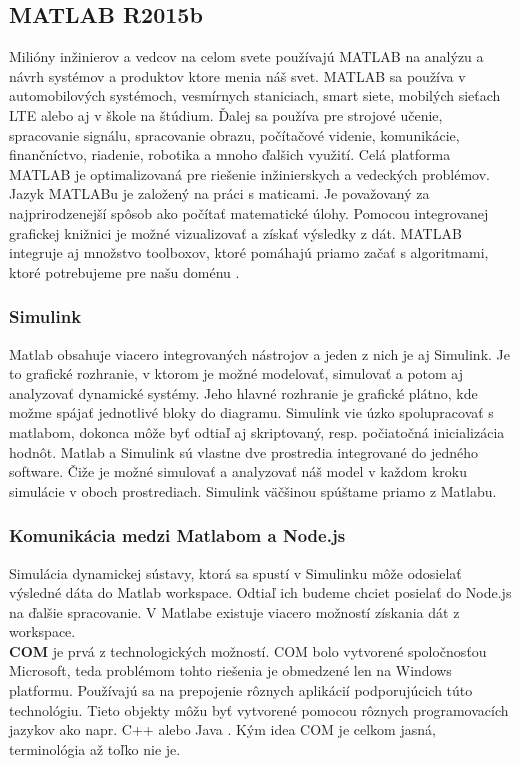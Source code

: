 \subsection{MATLAB R2015b}
Milióny inžinierov a vedcov na celom svete používajú MATLAB na analýzu a návrh systémov a produktov ktore menia náš svet. MATLAB sa používa v automobilových systémoch, vesmírnych staniciach, smart siete, mobilých sieťach LTE alebo aj v škole na štúdium. Ďalej sa používa pre strojové učenie, spracovanie signálu, spracovanie obrazu, počítačové videnie, komunikácie, finančníctvo, riadenie, robotika a mnoho ďalšich využití.
Celá platforma MATLAB je optimalizovaná pre riešenie inžinierskych a vedeckých problémov. Jazyk MATLABu je založený na práci s maticami. Je považovaný za najprirodzenejší spôsob ako počítať matematické úlohy. Pomocou integrovanej grafickej knižnici je možné vizualizovať a získať výsledky z dát. MATLAB integruje aj množstvo toolboxov, ktoré pomáhajú priamo začať s algoritmami, ktoré potrebujeme pre našu doménu \cite{matlab-mathworks}.

\subsubsection{Simulink}
Matlab obsahuje viacero integrovaných nástrojov a jeden z nich je aj Simulink. Je to grafické rozhranie, v ktorom je možné modelovať, simulovať a potom aj analyzovať dynamické systémy. Jeho hlavné rozhranie je grafické plátno, kde možme spájať jednotlivé bloky do diagramu. Simulink vie úzko spolupracovať s matlabom, dokonca môže byť odtiaľ aj skriptovaný, resp. počiatočná inicializácia hodnôt. Matlab a Simulink sú vlastne dve prostredia integrované do jedného software. Čiže je možné simulovať a analyzovať náš model v každom kroku simulácie v oboch prostrediach. Simulink väčšinou spúštame priamo z Matlabu.

\subsubsection{Komunikácia medzi Matlabom a Node.js}
Simulácia dynamickej sústavy, ktorá sa spustí v Simulinku môže odosielať výsledné dáta do Matlab workspace. Odtiaľ ich budeme chciet posielať do Node.js na ďalšie spracovanie. V Matlabe existuje viacero možností získania dát z workspace.\\

\textbf{COM} je prvá z technologických možností. COM bolo vytvorené spoločnosťou Microsoft, teda problémom tohto riešenia je obmedzené len na Windows platformu. Používajú sa na prepojenie rôznych aplikácií podporujúcich túto technológiu. Tieto objekty môžu byť vytvorené pomocou rôznych programovacích jazykov ako napr. C++ alebo Java \cite{matlab-microsoft-com}.
Kým idea COM je celkom jasná, terminológia až toľko nie je.

